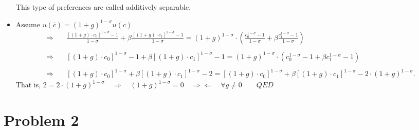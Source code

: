 \documentclass[12pt,a4paper]{article}
\begin{document}
\begin{itemize}
  This type of preferences are called additively separable. 

  \item  Assume $u(\bar{c}) = (1 + g)^{1-\sigma} u(c)$
    \begin{align*}
      \Rightarrow & \quad \frac{[(1 + g) \cdot c_0]^{1-\sigma} - 1}{1-\sigma} + \beta \frac{[(1 + g) \cdot c_1]^{1-\sigma} - 1}{1-\sigma} = (1+g)^{1 - \sigma} \cdot \left( \frac{c_0^{1-\sigma} - 1}{1-\sigma} + \beta \frac{c_1^{1-\sigma} - 1}{1-\sigma} \right) \\
      & \\
      \Rightarrow & \quad [(1 + g) \cdot c_0]^{1-\sigma} - 1 + \beta [(1 + g) \cdot c_1]^{1-\sigma} - 1 = (1+g)^{1 - \sigma} \cdot \left( c_0^{1-\sigma} - 1 + \beta c_1^{1-\sigma} - 1 \right) \\
      & \\
      \Rightarrow & \quad [(1 + g) \cdot c_0]^{1-\sigma} + \beta [(1 + g) \cdot c_1]^{1-\sigma} - 2 = [(1 + g) \cdot c_0]^{1 - \sigma} + \beta [(1 + g) \cdot c_1]^{1-\sigma}- 2 \cdot (1 + g)^{1 - \sigma}.
    \end{align*}
That is, $ 2 = 2 \cdot (1 + g)^{1 - \sigma} \quad \Rightarrow \quad (1 + g)^{1 - \sigma} = 0 \quad \Rightarrow\Leftarrow \quad \forall g \neq 0 \qquad QED$

\end{itemize}

\section*{Problem 2}
\end{document}
